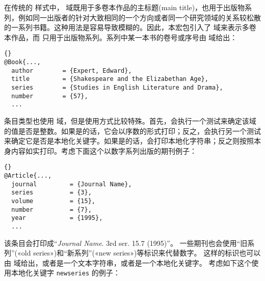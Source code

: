 在传统的 \BibTeX 样式中， 域既用于多卷本作品的主标题(main title)，也用于出版物系列，例如同一出版者的针对大致相同的一个方向或者同一个研究领域的关系较松散的一系列书籍。这种用法是容易导致模糊的。因此，本宏包引入了  域来表示多卷本作品，而  只用于出版物系列。系列中某一本书的卷号或序号由  域给出：

\begin{lstlisting}[style=bibtex]{}
@Book{...,
  author        = {Expert, Edward},
  title         = {Shakespeare and the Elizabethan Age},
  series        = {Studies in English Literature and Drama},
  number        = {57},
  ...
\end{lstlisting}
%
 条目类型也使用  域，但是使用方式比较特殊。首先，会执行一个测试来确定该域的值是否是整数。如果是的话，它会以序数的形式打印；反之，会执行另一个测试来确定它是否是本地化关键字。如果是的话，会打印本地化字符串；反之则按照本身内容如实打印。考虑下面这个以数字系列出版的期刊例子：

\begin{lstlisting}[style=bibtex]{}
@Article{...,
  journal         = {Journal Name},
  series          = {3},
  volume          = {15},
  number          = {7},
  year            = {1995},
  ...
\end{lstlisting}
%
该条目会打印成“\emph{Journal Name}. 3rd ser. 15.7 (1995)”。
一些期刊也会使用“旧系列”(«old series»)和“新系列”(«new series»)等标识来代替数字。
这样的标识也可以由  域给出，或者是一个文本字符串，或者是一个本地化关键字。
考虑如下这个使用本地化关键字 \texttt{newseries} 的例子：

